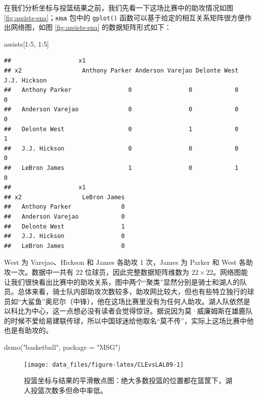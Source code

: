 \documentclass[
  b5paper,
  UTF8,twoside]{book}
\newenvironment{Shaded}{\begin{snugshade}}{\end{snugshade}}
\newcommand{\AttributeTok}[1]{\textcolor[rgb]{0.77,0.63,0.00}{#1}}
\newcommand{\DecValTok}[1]{\textcolor[rgb]{0.00,0.00,0.81}{#1}}
\newcommand{\FunctionTok}[1]{\textcolor[rgb]{0.00,0.00,0.00}{#1}}
\newcommand{\NormalTok}[1]{#1}
\newcommand{\SpecialCharTok}[1]{\textcolor[rgb]{0.00,0.00,0.00}{#1}}
\newcommand{\StringTok}[1]{\textcolor[rgb]{0.31,0.60,0.02}{#1}}
\begin{document}
在我们分析坐标与投篮结果之前，我们先看一下这场比赛中的助攻情况如图 \ref{fig:assists-sna}；\textbf{sna} 包中的 \texttt{gplot()} 函数可以基于给定的相互关系矩阵很方便作出网络图，如图 \ref{fig:assists-sna} 的数据矩阵形式如下：

\begin{Shaded}
\begin{Highlighting}[]
\NormalTok{assists[}\DecValTok{1}\SpecialCharTok{:}\DecValTok{5}\NormalTok{, }\DecValTok{1}\SpecialCharTok{:}\DecValTok{5}\NormalTok{]}
\end{Highlighting}
\end{Shaded}

\begin{verbatim}
##                   x1
## x2                 Anthony Parker Anderson Varejao Delonte West J.J. Hickson
##   Anthony Parker                0                0            0            0
##   Anderson Varejao              0                0            0            0
##   Delonte West                  0                1            0            1
##   J.J. Hickson                  0                0            0            0
##   LeBron James                  1                0            1            0
##                   x1
## x2                 LeBron James
##   Anthony Parker              0
##   Anderson Varejao            0
##   Delonte West                1
##   J.J. Hickson                0
##   LeBron James                0
\end{verbatim}

West 为 Varejao、Hickson 和 James 各助攻 1 次，James 为 Parker 和 West 各助攻一次。数据中一共有 22 位球员，因此完整数据矩阵维数为 \(22\times22\)。网络图能让我们很快看出比赛中的助攻关系，图中两个``聚类''显然分别是骑士和湖人的队员。总体来看，骑士队内部助攻次数较多，助攻网比较大，但也有些特立独行的球员如``大鲨鱼''奥尼尔（中锋），他在这场比赛里没有为任何人助攻。湖人队依然是以科比为中心，这一点想必没有读者会觉得惊讶。据说因为莫·威廉姆斯在雄鹿队的时候不爱给易建联传球，所以中国球迷给他取名``莫不传''，实际上这场比赛中他也是有助攻的。

\begin{Shaded}
\begin{Highlighting}[]
\FunctionTok{demo}\NormalTok{(}\StringTok{"basketball"}\NormalTok{, }\AttributeTok{package =} \StringTok{"MSG"}\NormalTok{)}
\end{Highlighting}
\end{Shaded}

\begin{figure}

{\centering \texttt{[image: data\_files/figure-latex/CLEvsLAL09-1]} 

}

\caption[ 投篮坐标与结果的平滑散点图 ]{投篮坐标与结果的平滑散点图：绝大多数投篮的位置都在篮筐下，湖人投篮次数多但命中率低。}\label{fig:CLEvsLAL09}
\end{figure}
\end{document}

